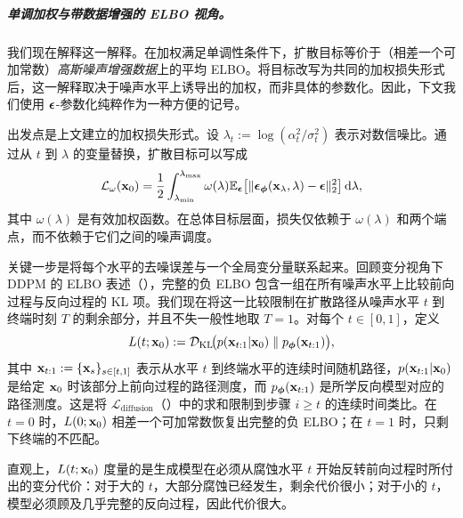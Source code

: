 \subparagraph{单调加权与带数据增强的 ELBO 视角。}
我们现在解释这一解释。在加权满足单调性条件下，扩散目标等价于（相差一个可加常数）\emph{高斯噪声增强数据}上的平均 ELBO。将目标改写为共同的加权损失形式后，这一解释取决于噪声水平上诱导出的加权，而非具体的参数化。因此，下文我们使用 ${\bm{\epsilon}}$-参数化纯粹作为一种方便的记号。

出发点是上文建立的加权损失形式。设
$\lambda_t := \log(\alpha_t^2/\sigma_t^2)$ 表示对数信噪比。通过从 $t$ 到 $\lambda$ 的变量替换，扩散目标可以写成
\[
\mathcal{L}_\omega({\mathbf{x}}_0)
= \frac{1}{2}
\int_{\lambda_{\min}}^{\lambda_{\max}}
\omega(\lambda) 
\mathbb{E}_{{\bm{\epsilon}}}\!\left[
\|{\bm{\epsilon}}_{\bm{\phi}}({\mathbf{x}}_\lambda,\lambda)-{\bm{\epsilon}}\|_2^2
\right]
\mathop{}\!\mathrm{d}\lambda,
\]
其中 $\omega(\lambda)$ 是有效加权函数。在总体目标层面，损失仅依赖于 $\omega(\lambda)$ 和两个端点，而不依赖于它们之间的噪声调度。

关键一步是将每个水平的去噪误差与一个全局变分量联系起来。回顾变分视角下 DDPM 的 ELBO 表述（），完整的负 ELBO 包含一组在所有噪声水平上比较前向过程与反向过程的 KL 项。我们现在将这一比较限制在扩散路径从噪声水平 $t$ 到终端时刻 $T$ 的剩余部分，并且不失一般性地取 $T=1$。对每个 $t \in [0,1]$，定义
\begin{equation}\label{eq:partial-chain-kl}
L(t;{\mathbf{x}}_0)
:=
\mathcal{D}_{\mathrm{KL}}\!\big(
  p({\mathbf{x}}_{t:1} |{\mathbf{x}}_0)
  \;\|\;
  p_{\bm{\phi}}({\mathbf{x}}_{t:1})
\big),
\end{equation}
其中 ${\mathbf{x}}_{t:1} := \{{\mathbf{x}}_s\}_{s \in [t,1]}$ 表示从水平 $t$ 到终端水平的连续时间随机路径，$p({\mathbf{x}}_{t:1} |{\mathbf{x}}_0)$ 是给定 ${\mathbf{x}}_0$ 时该部分上前向过程的路径测度，而 $p_{\bm{\phi}}({\mathbf{x}}_{t:1})$ 是所学反向模型对应的路径测度。这是将 $\mathcal{L}_{\mathrm{diffusion}}$（）中的求和限制到步骤 $i \geq t$ 的连续时间类比。在 $t = 0$ 时，$L(0;{\mathbf{x}}_0)$ 相差一个可加常数恢复出完整的负 ELBO；在 $t = 1$ 时，只剩下终端的不匹配。

直观上，$L(t;{\mathbf{x}}_0)$ 度量的是生成模型在必须从腐蚀水平 $t$ 开始反转前向过程时所付出的变分代价：对于大的 $t$，大部分腐蚀已经发生，剩余代价很小；对于小的 $t$，模型必须顾及几乎完整的反向过程，因此代价很大。

